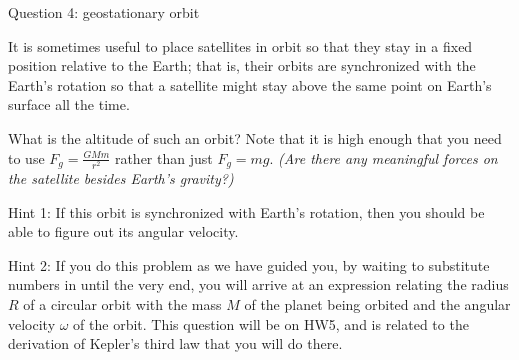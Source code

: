 \documentclass[12pt]{article}
\begin{document}
\newpage


\centerline{\Large Question 4: geostationary orbit}

It is sometimes useful to place satellites in orbit so that they stay in a fixed position relative to the
Earth; that is, their orbits are synchronized with the Earth's rotation so that a satellite might stay
above the same point on Earth’s surface all the time.

What is the altitude of such an orbit? Note that it is high enough that you need to use $F_g=\frac{GMm}{r^2}$
rather than just $F_g = mg$. {\it (Are there any meaningful forces on the satellite besides Earth's gravity?)}

{\sc Hint 1:} If this orbit is synchronized with Earth's rotation, then you should be able to figure out its
angular velocity.




{\sc Hint 2:} If you do this problem as we have guided you, by waiting to substitute numbers in until the 
very end, you will arrive at an expression relating the radius $R$ of a circular orbit with the mass $M$ of the 
planet being orbited and the angular velocity $\omega$ of the orbit. This question will be on HW5, and is related
to the derivation of Kepler's third law that you will do there.
%
%
%
%
%	
\end{document}
